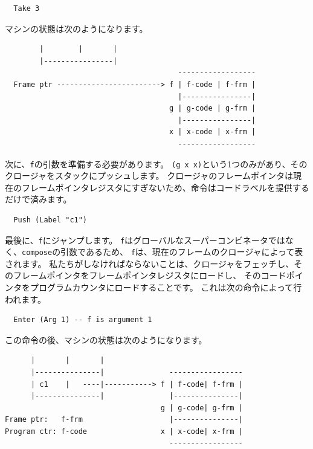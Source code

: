 \documentclass{jbook}
\begin{document}
\begin{verbatim}
  Take 3
\end{verbatim}

マシンの状態は次のようになります。

\begin{verbatim}
        |        |       |
        |----------------|
                                        ------------------
  Frame ptr ------------------------> f | f-code | f-frm |
                                        |----------------|
                                      g | g-code | g-frm |
                                        |----------------|
                                      x | x-code | x-frm |
                                        ------------------
\end{verbatim}

次に、\texttt{f}の引数を準備する必要があります。
\texttt{(g x x)}という1つのみがあり、そのクロージャをスタックにプッシュします。
クロージャのフレームポインタは現在のフレームポインタレジスタにすぎないため、命令はコードラベルを提供するだけで済みます。

\begin{verbatim}
  Push (Label "c1")
\end{verbatim}

最後に、\texttt{f}にジャンプします。
\texttt{f}はグローバルなスーパーコンビネータではなく、\texttt{compose}の引数であるため、
\texttt{f}は、現在のフレームのクロージャによって表されます。
私たちがしなければならないことは、クロージャをフェッチし、そのフレームポインタをフレームポインタレジスタにロードし、
そのコードポインタをプログラムカウンタにロードすることです。
これは次の命令によって行われます。

\begin{verbatim}
  Enter (Arg 1) -- f is argument 1
\end{verbatim}

この命令の後、マシンの状態は次のようになります。

\begin{verbatim}
      |       |       |
      |---------------|               -----------------
      | c1    |   ----|-----------> f | f-code| f-frm |
      |---------------|               |---------------|
                                    g | g-code| g-frm |
Frame ptr:   f-frm                    |---------------|
Program ctr: f-code                 x | x-code| x-frm |
                                      -----------------
\end{verbatim}
\end{document}
